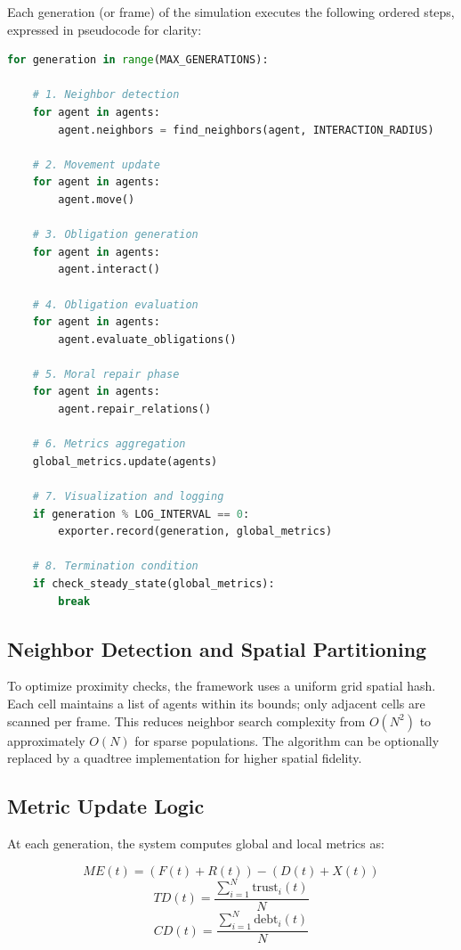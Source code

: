 \documentclass[11pt]{article}
\begin{document}
Each generation (or frame) of the simulation executes the following ordered steps, expressed in pseudocode for clarity:

\begin{lstlisting}[language=Python,caption={Simulation main loop (simplified pseudocode)}]
for generation in range(MAX_GENERATIONS):

    # 1. Neighbor detection
    for agent in agents:
        agent.neighbors = find_neighbors(agent, INTERACTION_RADIUS)

    # 2. Movement update
    for agent in agents:
        agent.move()

    # 3. Obligation generation
    for agent in agents:
        agent.interact()

    # 4. Obligation evaluation
    for agent in agents:
        agent.evaluate_obligations()

    # 5. Moral repair phase
    for agent in agents:
        agent.repair_relations()

    # 6. Metrics aggregation
    global_metrics.update(agents)

    # 7. Visualization and logging
    if generation % LOG_INTERVAL == 0:
        exporter.record(generation, global_metrics)

    # 8. Termination condition
    if check_steady_state(global_metrics):
        break
\end{lstlisting}

\subsection{Neighbor Detection and Spatial Partitioning}

To optimize proximity checks, the framework uses a uniform grid spatial hash. Each cell maintains a list of agents within its bounds; only adjacent cells are scanned per frame. This reduces neighbor search complexity from $O(N^2)$ to approximately $O(N)$ for sparse populations.  
The algorithm can be optionally replaced by a quadtree implementation for higher spatial fidelity.

\subsection{Metric Update Logic}

At each generation, the system computes global and local metrics as:

\[
ME(t) = (F(t) + R(t)) - (D(t) + X(t))
\]
\[
TD(t) = \frac{\sum_{i=1}^{N}\text{trust}_i(t)}{N}
\]
\[
CD(t) = \frac{\sum_{i=1}^{N}\text{debt}_i(t)}{N}
\]
\end{document}
